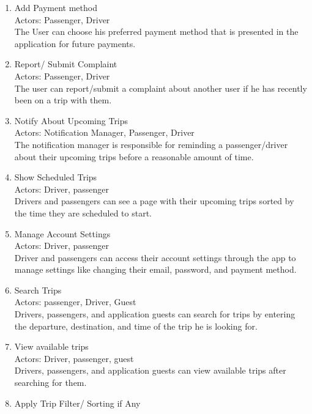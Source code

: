 \documentclass[a4paper, 12pt]{report} %
\begin{document}
\begin{enumerate}
                \item Add Payment method \\
                    Actors: Passenger, Driver \\
                    The User can choose his preferred payment method that is presented in the application for future payments.
                \item Report/ Submit Complaint \\
                    Actors: Passenger, Driver \\
                    The user can report/submit a complaint about another user if he has recently been on a trip with them.
                \item Notify About Upcoming Trips \\
                    Actors: Notification Manager, Passenger, Driver \\
                    The notification manager is responsible for reminding a passenger/driver about their upcoming trips before a reasonable amount of time.
                \item Show Scheduled Trips \\
                    Actors: Driver, passenger \\
                    Drivers and passengers can see a page with their upcoming trips sorted by the time they are scheduled to start. 
                \item Manage Account Settings\\ 
                    Actors: Driver, passenger\\
                    Driver and passengers can access their account settings through the app to manage settings like changing their email, password, and payment method.
                \item Search Trips \\
                    Actors: passenger, Driver, Guest \\
                    Drivers, passengers, and application guests can search for trips by entering the departure, destination, and time of the trip he is looking for.
                \item View available trips \\
                    Actors: Driver, passenger, guest \\
                    Drivers, passengers, and application guests can view available trips after searching for them.
                \item Apply Trip Filter/ Sorting if Any \\

\end{enumerate}
\end{document}

